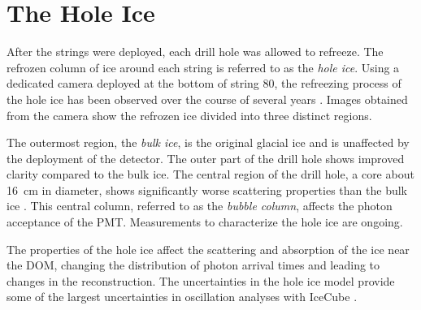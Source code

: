 \section{The Hole Ice}
\label{sec:hole_ice}
After the strings were deployed, each drill hole was allowed to refreeze. 
The refrozen column of ice around each string is referred to as the \emph{hole ice}.
Using a dedicated camera deployed at the bottom of string 80, the refreezing process of the hole ice has been observed over the course of several years \cite{IceCube-SwedishCamera, Description-IceCube}.
Images obtained from the camera show the refrozen ice divided into three distinct regions.

The outermost region, the \emph{bulk ice}, is the original glacial ice and is unaffected by the deployment of the detector.
The outer part of the drill hole shows improved clarity compared to the bulk ice.
The central region of the drill hole, a core about 16~cm in diameter, shows significantly worse scattering properties than the bulk ice \cite{Description-IceCube}.
This central column, referred to as the \emph{bubble column}, affects the photon acceptance of the PMT.
Measurements to characterize the hole ice are ongoing.

The properties of the hole ice affect the scattering and absorption of the ice near the DOM, changing the distribution of photon arrival times and leading to changes in the reconstruction.
The uncertainties in the hole ice model provide some of the largest uncertainties in oscillation analyses with IceCube \cite{IceCube-Oscillation2018}.


